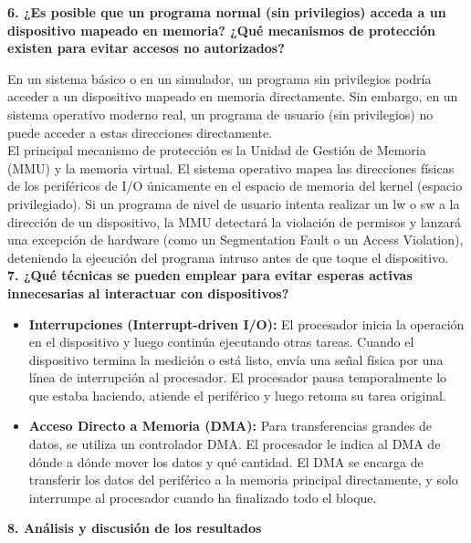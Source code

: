 \documentclass[]{article}
\begin{document}
	{\large \textbf{6. ¿Es posible que un programa normal (sin privilegios) acceda a un dispositivo mapeado en memoria? ¿Qué mecanismos de protección existen para evitar accesos no autorizados?}}
	
	En un sistema básico o en un simulador, un programa sin privilegios podría acceder a un dispositivo mapeado en memoria directamente. Sin embargo, en un sistema operativo moderno real, un programa de usuario (sin privilegios) no puede acceder a estas direcciones directamente. \\
	
	El principal mecanismo de protección es la Unidad de Gestión de Memoria (MMU) y la memoria virtual. El sistema operativo mapea las direcciones físicas de los periféricos de I/O únicamente en el espacio de memoria del kernel (espacio privilegiado). Si un programa de nivel de usuario intenta realizar un lw o sw a la dirección de un dispositivo, la MMU detectará la violación de permisos y lanzará una excepción de hardware (como un Segmentation Fault o un Access Violation), deteniendo la ejecución del programa intruso antes de que toque el dispositivo. \\
	
	{\large \textbf{7. ¿Qué técnicas se pueden emplear para evitar esperas activas innecesarias al interactuar con dispositivos?}}
	
	\begin{itemize}
		\item \textbf{Interrupciones (Interrupt-driven I/O):} El procesador inicia la operación en el dispositivo y luego continúa ejecutando otras tareas. Cuando el dispositivo termina la medición o está listo, envía una señal física por una línea de interrupción al procesador. El procesador pausa temporalmente lo que estaba haciendo, atiende el periférico y luego retoma su tarea original.
		
		\item \textbf{Acceso Directo a Memoria (DMA):} Para transferencias grandes de datos, se utiliza un controlador DMA. El procesador le indica al DMA de dónde a dónde mover los datos y qué cantidad. El DMA se encarga de transferir los datos del periférico a la memoria principal directamente, y solo interrumpe al procesador cuando ha finalizado todo el bloque.
	\end{itemize}
	
	\newpage
	
	{\large \textbf{8. Análisis y discusión de los resultados}} \\
	
\end{document}
